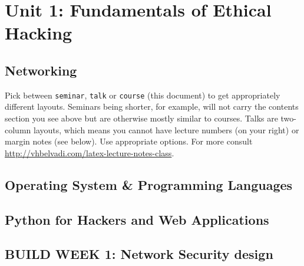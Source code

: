 \section{Unit 1: Fundamentals of Ethical Hacking}

\subsection{Networking}
Pick between \texttt{seminar}, \texttt{talk} or \texttt{course} (this document) to get appropriately different layouts. Seminars being shorter, for example, will not carry the contents section you see above but are otherwise mostly similar to courses. Talks are two-column layouts, which means you cannot have lecture numbers (on your right) or margin notes (see below). Use appropriate options. For more consult \url{http://vhbelvadi.com/latex-lecture-notes-class}.

\subsection{Operating System \& Programming Languages}

\subsection{Python for Hackers and Web Applications}

\subsection{BUILD WEEK 1: Network Security design}
